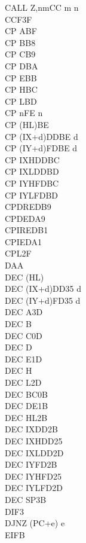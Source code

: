 \documentclass[12pt,twoside,openright,a4paper]{book}
\begin{document}
\begin{multicols}{3}
{\begin{tabbing}
		CALL Z,nm\>CC m n\\
		CCF\>3F\\
		CP A\>BF\\
		CP B\>B8\\
		CP C\>B9\\
		CP D\>BA\\
		CP E\>BB\\
		CP H\>BC\\
		CP L\>BD\\
		CP n\>FE n\\
		CP (HL)\>BE\\
		CP (IX+d)\>DDBE d\\
		CP (IY+d)\>FDBE d\\
		CP IXH\UNDOC\>DDBC\\
		CP IXL\UNDOC\>DDBD\\
		CP IYH\UNDOC\>FDBC\\
		CP IYL\UNDOC\>FDBD\\
		CPDR\>EDB9\\
		CPD\>EDA9\\
		CPIR\>EDB1\\
		CPI\>EDA1\\
		CPL\>2F\\
		DAA\\
		DEC (HL)\\
		DEC (IX+d)\>DD35 d\\
		DEC (IY+d)\>FD35 d\\
		DEC A\>3D\\
		DEC B\\
		DEC C\>0D\\
		DEC D\\
		DEC E\>1D\\
		DEC H\\
		DEC L\>2D\\
		DEC BC\>0B\\
		DEC DE\>1B\\
		DEC HL\>2B\\
		DEC IX\>DD2B\\
		DEC IXH\UNDOC\>DD25\\
		DEC IXL\UNDOC\>DD2D\\
		DEC IY\>FD2B\\
		DEC IYH\UNDOC\>FD25\\
		DEC IYL\UNDOC\>FD2D\\
		DEC SP\>3B\\
		DI\>F3\\
		DJNZ (PC+e) e\\
		EI\>FB\\

\end{tabbing}}
\end{multicols}
\end{document}
